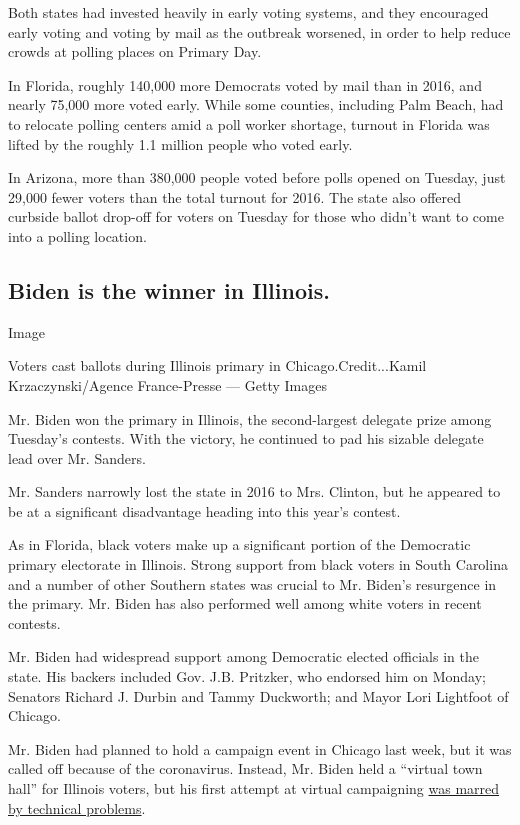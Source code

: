 Both states had invested heavily in early voting systems, and they
encouraged early voting and voting by mail as the outbreak worsened, in
order to help reduce crowds at polling places on Primary Day.

In Florida, roughly 140,000 more Democrats voted by mail than in 2016,
and nearly 75,000 more voted early. While some counties, including Palm
Beach, had to relocate polling centers amid a poll worker shortage,
turnout in Florida was lifted by the roughly 1.1 million people who
voted early.

In Arizona, more than 380,000 people voted before polls opened on
Tuesday, just 29,000 fewer voters than the total turnout for 2016. The
state also offered curbside ballot drop-off for voters on Tuesday for
those who didn't want to come into a polling location.

\hypertarget{biden-is-the-winner-in-illinois}{%
\subsection{Biden is the winner in
Illinois.}\label{biden-is-the-winner-in-illinois}}

Image

Voters cast ballots during Illinois primary in Chicago.Credit...Kamil
Krzaczynski/Agence France-Presse --- Getty Images

Mr. Biden won the primary in Illinois, the second-largest delegate prize
among Tuesday's contests. With the victory, he continued to pad his
sizable delegate lead over Mr. Sanders.

Mr. Sanders narrowly lost the state in 2016 to Mrs. Clinton, but he
appeared to be at a significant disadvantage heading into this year's
contest.

As in Florida, black voters make up a significant portion of the
Democratic primary electorate in Illinois. Strong support from black
voters in South Carolina and a number of other Southern states was
crucial to Mr. Biden's resurgence in the primary. Mr. Biden has also
performed well among white voters in recent contests.

Mr. Biden had widespread support among Democratic elected officials in
the state. His backers included Gov. J.B. Pritzker, who endorsed him on
Monday; Senators Richard J. Durbin and Tammy Duckworth; and Mayor Lori
Lightfoot of Chicago.

Mr. Biden had planned to hold a campaign event in Chicago last week, but
it was called off because of the coronavirus. Instead, Mr. Biden held a
``virtual town hall'' for Illinois voters, but his first attempt at
virtual campaigning
\href{https://www.nytimes3xbfgragh.onion/2020/03/13/us/politics/joe-biden-digital-campaign.html}{was
marred by technical problems}.

